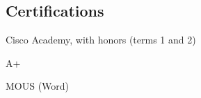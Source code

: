 \documentclass[margin,line]{resume}
\begin{document}
\begin{resume}
\section{\mysidestyle Certifications}
	\begin{asparablank}
		\item Cisco Academy, with honors (terms 1 and 2)
		\item A+
		\item MOUS (Word)
	\end{asparablank}

\end{resume}
\pagebreak[4] %

\end{document}
